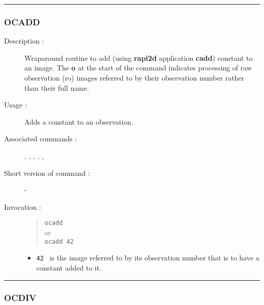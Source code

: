 \hrule 
\subsubsection*{\label{OCADD}OCADD}

\begin{description}

\item[Description :] Wraparound routine to add (using {\bf rapi2d}
application {\bf cadd}) constant to an image. The {\bf o} at the start of the
command indicates processing of raw observation ({\sc ro}) images
referred to by their observation number rather than their full name.

\item[Usage :] Adds a constant to an observation.

\item[Associated commands :] {\tt {}}, 
{\tt {}}, {\tt {}}, 
{\tt {}}, {\tt {}}, 
{\tt {}}

\item[Short version of command :] -
\item[Invocation :]

\begin{quote}{\tt  ocadd }\\
or \\
{\tt ocadd 42 }
\end{quote}

\begin{itemize}

\item {\tt 42 } is the image referred to by its observation number that
 is to have a constant added to it.
\end{itemize}

\end{description}

\hrule 
\subsubsection*{\label{OCDIV}OCDIV}

